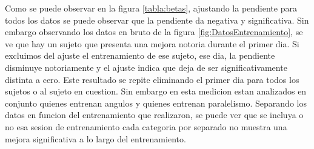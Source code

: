 \documentclass{article}
\begin{document}
Como se puede observar en la figura \ref{tabla:betas}, ajustando la pendiente para todos los datos se puede observar que la pendiente da negativa y significativa. Sin embargo observando los datos en bruto de la figura \ref{fig:DatosEntrenamiento}, se ve que hay un sujeto que presenta una mejora notoria durante el primer dia. Si excluimos del ajuste el entrenamiento de ese sujeto, ese dia, la pendiente disminuye notoriamente y el ajuste indica que deja de ser significativamente distinta a cero. Este resultado se repite eliminando el primer dia para todos los sujetos o al sujeto en cuestion. Sin embargo en esta medicion estan analizados en conjunto quienes entrenan angulos y quienes entrenan paralelismo. Separando los datos en funcion del entrenamiento que realizaron, se puede ver que se incluya o no esa sesion de entrenamiento cada categoria por separado no muestra una mejora significativa a lo largo del entrenamiento. 
\end{document}
